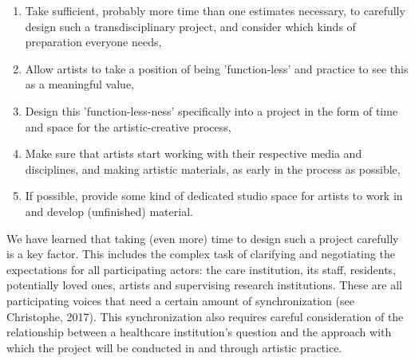 \documentclass[authordate, empirical]{jote-new-article}
\begin{document}
	\begin{enumerate}


		\item Take sufficient, probably more time than one estimates necessary, to carefully design such a transdisciplinary project, and consider which kinds of preparation everyone needs,



		\item
		Allow artists to take a position of being 'function-less' and practice to see this as a meaningful value,



		\item Design this 'function-less-ness' specifically into a project in the form of time and space for the artistic-creative process,



		\item
		Make sure that artists start working with their respective media and disciplines, and making artistic materials, as early in the process as possible,



		\item If possible, provide some kind of dedicated studio space for artists to work in and develop (unfinished) material.


	\end{enumerate}





	We have learned that taking (even more) time to design such a project carefully is a key factor. This includes the complex task of clarifying and negotiating the expectations for all participating actors: the care institution, its staff, residents, potentially loved ones, artists and supervising research institutions. These are all participating voices that need a certain amount of synchronization (see Christophe, 2017). This synchronization also requires careful consideration of the relationship between a healthcare institution's question and the approach with which the project will be conducted in and through artistic practice.
\end{document}
